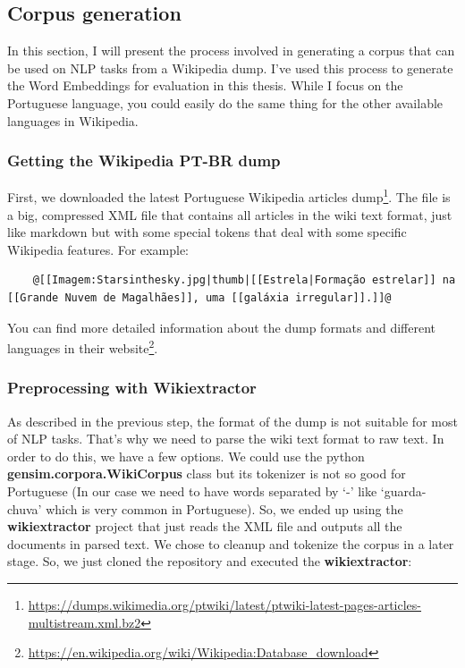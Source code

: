 \subsection{Corpus generation}\label{chap:methodsandmaterials:corpus}

In this section, I will present the process involved in generating a corpus that can be used on NLP tasks from a Wikipedia dump. I’ve used this process to generate the Word Embeddings for evaluation in this thesis. While I focus on the Portuguese language, you could easily do the same thing for the other available languages in Wikipedia.

\subsubsection{Getting the Wikipedia PT-BR dump}

First, we downloaded the latest Portuguese Wikipedia articles dump\footnote{\url{https://dumps.wikimedia.org/ptwiki/latest/ptwiki-latest-pages-articles-multistream.xml.bz2}}. The file is a big, compressed XML file that contains all articles in the wiki text format, just like markdown but with some special tokens that deal with some specific Wikipedia features. For example:

\begin{lstlisting}
    @[[Imagem:Starsinthesky.jpg|thumb|[[Estrela|Formação estrelar]] na [[Grande Nuvem de Magalhães]], uma [[galáxia irregular]].]]@
\end{lstlisting}

You can find more detailed information about the dump formats and different languages in their website\footnote{\url{https://en.wikipedia.org/wiki/Wikipedia:Database_download}}.

\subsubsection{Preprocessing with Wikiextractor}

As described in the previous step, the format of the dump is not suitable for most of NLP tasks. That’s why we need to parse the wiki text format to raw text. In order to do this, we have a few options. We could use the python \textbf{gensim.corpora.WikiCorpus} class but its tokenizer is not so good for Portuguese (In our case we need to have words separated by ‘-’ like ‘guarda-chuva’ which is very common in Portuguese). So, we ended up using the \textbf{wikiextractor} project that just reads the XML file and outputs all the documents in parsed text. We chose to cleanup and tokenize the corpus in a later stage. So, we just cloned the repository and executed the \textbf{wikiextractor}:

